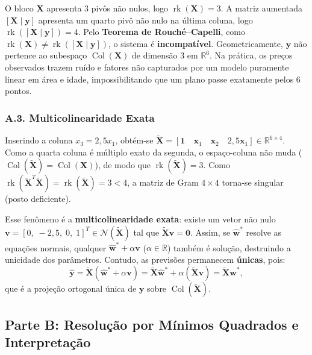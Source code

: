 \documentclass[11pt,a4paper]{article}
\begin{document}
O bloco $\mathbf{X}$ apresenta 3 pivôs não nulos, logo $\operatorname{rk}(\mathbf{X}) = 3$. A matriz aumentada $[\mathbf{X} \mid \mathbf{y}]$ apresenta um quarto pivô não nulo na última coluna, logo $\operatorname{rk}([\mathbf{X} \mid \mathbf{y}]) = 4$. Pelo \textbf{Teorema de Rouché--Capelli}, como $\operatorname{rk}(\mathbf{X}) \ne \operatorname{rk}([\mathbf{X} \mid \mathbf{y}])$, o sistema é \textbf{incompatível}. Geometricamente, $\mathbf{y}$ não pertence ao subespaço $\operatorname{Col}(\mathbf{X})$ de dimensão 3 em $\mathbb{R}^6$. Na prática, os preços observados trazem ruído e fatores não capturados por um modelo puramente linear em área e idade, impossibilitando que um plano passe exatamente pelos 6 pontos.

\subsubsection*{A.3. Multicolinearidade Exata}
Inserindo a coluna $x_3 = 2{,}5 x_1$, obtém-se $\tilde{\mathbf{X}} = [\mathbf{1} \quad \mathbf{x}_1 \quad \mathbf{x}_2 \quad 2{,}5\mathbf{x}_1] \in \mathbb{R}^{6 \times 4}$. Como a quarta coluna é múltiplo exato da segunda, o espaço-coluna não muda ($\operatorname{Col}(\tilde{\mathbf{X}}) = \operatorname{Col}(\mathbf{X})$), de modo que $\operatorname{rk}(\tilde{\mathbf{X}}) = 3$. Como $\operatorname{rk}(\tilde{\mathbf{X}}^T\tilde{\mathbf{X}}) = \operatorname{rk}(\tilde{\mathbf{X}}) = 3 < 4$, a matriz de Gram $4 \times 4$ torna-se singular (posto deficiente).

Esse fenômeno é a \textbf{multicolinearidade exata}: existe um vetor não nulo $\mathbf{v} = [0,\; -2{,}5,\; 0,\; 1]^T \in \mathcal{N}(\tilde{\mathbf{X}})$ tal que $\tilde{\mathbf{X}}\mathbf{v} = \mathbf{0}$. Assim, se $\hat{\mathbf{w}}^*$ resolve as equações normais, qualquer $\hat{\mathbf{w}}^* + \alpha\mathbf{v}$ ($\alpha \in \mathbb{R}$) também é solução, destruindo a unicidade dos parâmetros. Contudo, as previsões permanecem \textbf{únicas}, pois:
\[
\hat{\mathbf{y}} = \tilde{\mathbf{X}}(\hat{\mathbf{w}}^* + \alpha\mathbf{v}) = \tilde{\mathbf{X}}\hat{\mathbf{w}}^* + \alpha(\tilde{\mathbf{X}}\mathbf{v}) = \tilde{\mathbf{X}}\hat{\mathbf{w}}^*,
\]
que é a projeção ortogonal única de $\mathbf{y}$ sobre $\operatorname{Col}(\tilde{\mathbf{X}})$.

\subsection{Parte B: Resolução por Mínimos Quadrados e Interpretação}
\end{document}
